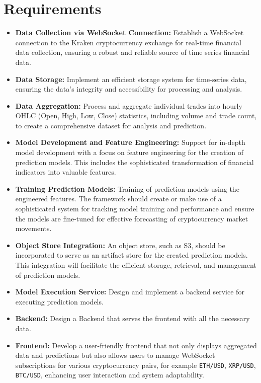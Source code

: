 \section{Requirements}
\begin{itemize}
    \item \textbf{Data Collection via WebSocket Connection:} Establish a WebSocket connection to the Kraken cryptocurrency exchange \cite{kraken_homepage} for real-time financial data collection, ensuring a robust and reliable source of time series financial data.
    
    \item \textbf{Data Storage:} Implement an efficient storage system for time-series data, ensuring the data's integrity and accessibility for processing and analysis. 
    
    \item \textbf{Data Aggregation:} Process and aggregate individual trades into hourly OHLC (Open, High, Low, Close) statistics, including volume and trade count, to create a comprehensive dataset for analysis and prediction.
    
    \item \textbf{Model Development and Feature Engineering:} Support for in-depth model development with a focus on feature engineering for the creation of prediction models. This includes the sophisticated transformation of financial indicators into valuable features.
    
    \item \textbf{Training Prediction Models:} Training of prediction models using the engineered features. The framework should create or make use of a sophisticated system for tracking model training and performance and ensure the models are fine-tuned for effective forecasting of cryptocurrency market movements.
    
    \item \textbf{Object Store Integration:} An object store, such as S3, should be incorporated to serve as an artifact store for the created prediction models. This integration will facilitate the efficient storage, retrieval, and management of prediction models.
    
    \item \textbf{Model Execution Service:} Design and implement a backend service for executing prediction models.
    
    \item \textbf{Backend:} Design a Backend that serves the frontend with all the necessary data.

    \item \textbf{Frontend:} Develop a user-friendly frontend that not only displays aggregated data and predictions but also allows users to manage WebSocket subscriptions for various cryptocurrency pairs, for example \texttt{ETH/USD}, \texttt{XRP/USD}, \texttt{BTC/USD}, enhancing user interaction and system adaptability.
\end{itemize}
